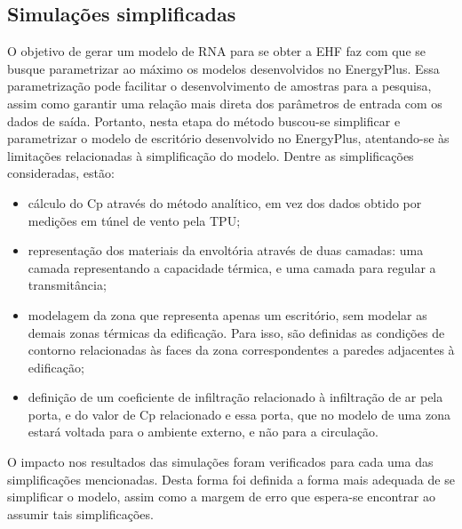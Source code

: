 \documentclass[brazil,hardcopy,openany,a5paper]{ufscthesis}
\begin{document}
		
		\subsection{Simulações simplificadas}
		
		O objetivo de gerar um modelo de RNA para se obter a EHF faz com que se busque parametrizar ao máximo os modelos desenvolvidos no EnergyPlus. Essa parametrização pode facilitar o desenvolvimento de amostras para a pesquisa, assim como garantir uma relação mais direta dos parâmetros de entrada com os dados de saída. Portanto, nesta etapa do método buscou-se simplificar e parametrizar o modelo de escritório desenvolvido no EnergyPlus, atentando-se às limitações relacionadas à simplificação do modelo.
		Dentre as simplificações consideradas, estão:
		
		\begin{itemize}
		\item cálculo do Cp através do método analítico, em vez dos dados obtido por medições em túnel de vento pela TPU;
		\item representação dos materiais da envoltória através de duas camadas: uma camada representando a capacidade térmica, e uma camada para regular a transmitância;  %
		\item modelagem da zona que representa apenas um escritório, sem modelar as demais zonas térmicas da edificação. Para isso, são definidas as condições de contorno relacionadas às faces da zona correspondentes a paredes adjacentes à edificação;
		\item definição de um coeficiente de infiltração relacionado à infiltração de ar pela porta, e do valor de Cp relacionado e essa porta, que no modelo de uma zona estará voltada para o ambiente externo, e não para a circulação.
		\end{itemize}
		
		O impacto nos resultados das simulações foram verificados para cada uma das simplificações mencionadas. Desta forma foi definida a forma mais adequada de se simplificar o modelo, assim como a margem de erro que espera-se encontrar ao assumir tais simplificações.
		
\end{document}
